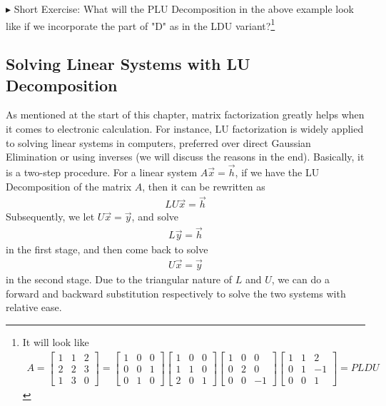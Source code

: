 $\blacktriangleright$ Short Exercise: What will the PLU Decomposition in the above example look like if we incorporate the part of "D" as in the LDU variant?\footnote{It will look like
\begin{align*}
A = \begin{bmatrix}
1 & 1 & 2 \\
2 & 2 & 3 \\
1 & 3 & 0
\end{bmatrix} 
=
\begin{bmatrix}
1 & 0 & 0 \\
0 & 0 & 1 \\
0 & 1 & 0    
\end{bmatrix}
\begin{bmatrix}
1 & 0 & 0 \\
1 & 1 & 0 \\
2 & 0 & 1
\end{bmatrix}
\begin{bmatrix}
1 & 0 & 0 \\
0 & 2 & 0 \\
0 & 0 & -1
\end{bmatrix}
\begin{bmatrix}
1 & 1 & 2 \\
0 & 1 & -1 \\
0 & 0 & 1 
\end{bmatrix}
= PLDU
\end{align*}}

\subsection{Solving Linear Systems with LU Decomposition}
As mentioned at the start of this chapter, matrix factorization greatly helps when it comes to electronic calculation. For instance, LU factorization is widely applied to solving linear systems in computers, preferred over direct Gaussian Elimination or using inverses (we will discuss the reasons in the end). Basically, it is a two-step procedure. For a linear system $A\vec{x} = \vec{h}$, if we have the LU Decomposition of the matrix $A$, then it can be rewritten as 
\begin{align}
LU\vec{x} = \vec{h}    
\end{align}
Subsequently, we let $U\vec{x} = \vec{y}$, and solve 
\begin{align}
L\vec{y} = \vec{h}
\end{align}
in the first stage, and then come back to solve 
\begin{align}
U\vec{x} = \vec{y}
\end{align}
in the second stage. Due to the triangular nature of $L$ and $U$, we can do a forward and backward substitution respectively to solve the two systems with relative ease.

